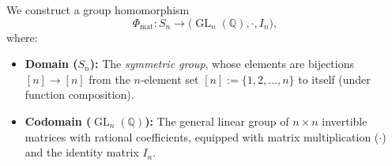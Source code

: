 \begin{content}

We construct a group homomorphism
\[
\Phi_{\text{mat}} \colon S_n \longrightarrow \bigl(\operatorname{GL}_n(\mathbb{Q}), \cdot, I_n\bigr),
\]
where:
\begin{itemize}
    \item \textbf{Domain ($S_n$):} The \emph{symmetric group}, whose elements are bijections $[n] \to [n]$ from the $n$-element set $[n] := \{1, 2, \dots, n\}$ to itself (under function composition).
    \item \textbf{Codomain ($\operatorname{GL}_n(\mathbb{Q})$):} The general linear group of $n \times n$ invertible matrices with rational coefficients, equipped with matrix multiplication ($\cdot$) and the identity matrix $I_n$.
\end{itemize}
\end{content}

